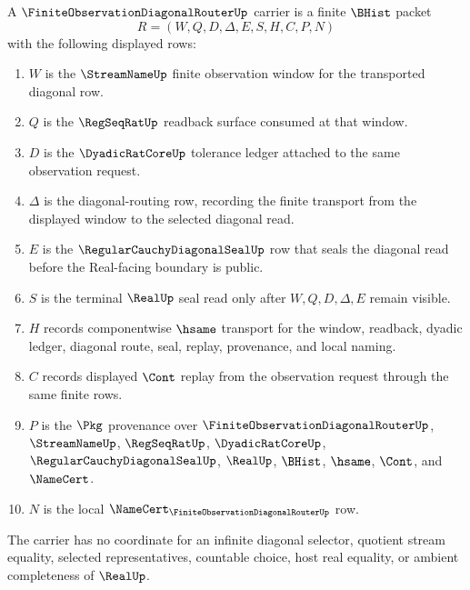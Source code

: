 \begin{definition}
\label{def:finite-observation-diagonal-router-carrier}
A $\FiniteObservationDiagonalRouterUp$ carrier is a finite $\BHist$ packet
$$
R=(W,Q,D,\Delta,E,S,H,C,P,N)
$$
with the following displayed rows:
\begin{enumerate}
\item $W$ is the $\StreamNameUp$ finite observation window for the transported diagonal row.
\item $Q$ is the $\RegSeqRatUp$ readback surface consumed at that window.
\item $D$ is the $\DyadicRatCoreUp$ tolerance ledger attached to the same observation request.
\item $\Delta$ is the diagonal-routing row, recording the finite transport from the displayed window to the selected diagonal read.
\item $E$ is the $\RegularCauchyDiagonalSealUp$ row that seals the diagonal read before the Real-facing boundary is public.
\item $S$ is the terminal $\RealUp$ seal read only after $W,Q,D,\Delta,E$ remain visible.
\item $H$ records componentwise $\hsame$ transport for the window, readback, dyadic ledger, diagonal route, seal, replay, provenance, and local naming.
\item $C$ records displayed $\Cont$ replay from the observation request through the same finite rows.
\item $P$ is the $\Pkg$ provenance over $\FiniteObservationDiagonalRouterUp$, $\StreamNameUp$, $\RegSeqRatUp$, $\DyadicRatCoreUp$, $\RegularCauchyDiagonalSealUp$, $\RealUp$, $\BHist$, $\hsame$, $\Cont$, and $\NameCert$.
\item $N$ is the local $\NameCert_{\FiniteObservationDiagonalRouterUp}$ row.
\end{enumerate}
The carrier has no coordinate for an infinite diagonal selector, quotient stream equality, selected representatives, countable choice, host real equality, or ambient completeness of $\RealUp$.
\end{definition}

